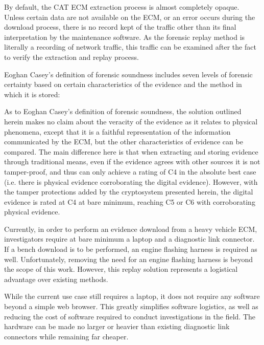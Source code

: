 By default, the CAT ECM extraction process is almost completely opaque. Unless certain data are not available on the ECM, or an error
occurs during the download process, there is no record kept of the traffic other than its final interpretation by the maintenance
software. As the forensic replay method is literally a recording of network traffic, this traffic can be examined after the fact
to verify the extraction and replay process.

Eoghan Casey's definition of forensic soundness includes seven levels of forensic certainty based on certain characteristics
of the evidence and the method in which it is stored:

As to Eoghan Casey's definition of forensic soundness, the solution outlined herein makes no claim about the veracity of the evidence as it relates to physical phenomena, except that it 
is a faithful representation of the information communicated
by the ECM, but the other characteristics of evidence can be compared. The main difference here is that when extracting and storing evidence through traditional means, even if the
evidence agrees with other sources it is not tamper-proof, and thus can only achieve a rating of C4 in the absolute best case (i.e. there is physical evidence corroborating the 
digital evidence). However, with the tamper protections added by the cryptosystem presented herein, the digital evidence is rated at C4 at bare minimum, reaching C5 or C6 with corroborating
physical evidence. 


Currently, in order to perform an evidence download from a heavy vehicle ECM, investigators require at bare minimum a laptop and a diagnostic link connector.
If a bench download is to be performed, an engine flashing harness is required as well. Unfortunately, removing the need for an engine flashing harness is
beyond the scope of this work. However, this replay solution represents a logistical advantage over existing methods.

While the current use case still requires a laptop, it does not require any software beyond a simple web browser. This greatly simplifies software logistics, as well
as reducing the cost of software required to conduct investigations in the field. The hardware can be made no larger or heavier than existing diagnostic link connectors
while remaining far cheaper.



